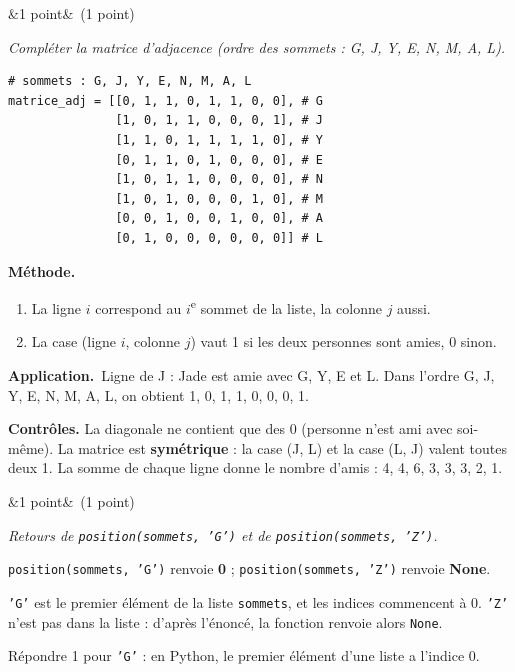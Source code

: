 \documentclass[11pt, a4paper]{exam}
\newcommand{\code}[1]{\texttt{#1}}
\newcommand{\Q}[3]{\par\needspace{5\baselineskip}\bigskip\noindent{\large\bfseries Question #1}\ifx&#2&\else\ \textnormal{(#2)}\fi\par\nopagebreak\smallskip\noindent\textit{#3}\par\nopagebreak\smallskip}
\newcommand{\methode}{\par\noindent\textbf{Méthode.}\ }
\newcommand{\application}{\par\noindent\textbf{Application.}\ }
\begin{document}
\Q{2 (a)}{1 point}{Compléter la matrice d'adjacence (ordre des sommets : G, J, Y, E, N, M, A, L).}
\begin{reponse}
\begin{lstlisting}
# sommets : G, J, Y, E, N, M, A, L
matrice_adj = [[0, 1, 1, 0, 1, 1, 0, 0], # G
               [1, 0, 1, 1, 0, 0, 0, 1], # J
               [1, 1, 0, 1, 1, 1, 1, 0], # Y
               [0, 1, 1, 0, 1, 0, 0, 0], # E
               [1, 0, 1, 1, 0, 0, 0, 0], # N
               [1, 0, 1, 0, 0, 0, 1, 0], # M
               [0, 0, 1, 0, 0, 1, 0, 0], # A
               [0, 1, 0, 0, 0, 0, 0, 0]] # L
\end{lstlisting}
\end{reponse}
\methode
\begin{enumerate}
\item La ligne $i$ correspond au $i$\textsuperscript{e} sommet de la liste, la colonne $j$ aussi.
\item La case (ligne $i$, colonne $j$) vaut 1 si les deux personnes sont amies, 0 sinon.
\end{enumerate}
\application Ligne de J : Jade est amie avec G, Y, E et L. Dans l'ordre G, J, Y, E, N, M, A, L, on obtient 1, 0, 1, 1, 0, 0, 0, 1.

\textbf{Contrôles.} La diagonale ne contient que des 0 (personne n'est ami avec soi-même). La matrice est \textbf{symétrique} : la case (J, L) et la case (L, J) valent toutes deux 1. La somme de chaque ligne donne le nombre d'amis : 4, 4, 6, 3, 3, 3, 2, 1.

\Q{2 (b)}{1 point}{Retours de \code{position(sommets, 'G')} et de \code{position(sommets, 'Z')}.}
\begin{reponse}
\code{position(sommets, 'G')} renvoie \textbf{0} ; \code{position(sommets, 'Z')} renvoie \textbf{None}.
\end{reponse}
\code{'G'} est le premier élément de la liste \code{sommets}, et les indices commencent à 0. \code{'Z'} n'est pas dans la liste : d'après l'énoncé, la fonction renvoie alors \code{None}.
\begin{erreur}
Répondre 1 pour \code{'G'} : en Python, le premier élément d'une liste a l'indice 0.
\end{erreur}
\end{document}
